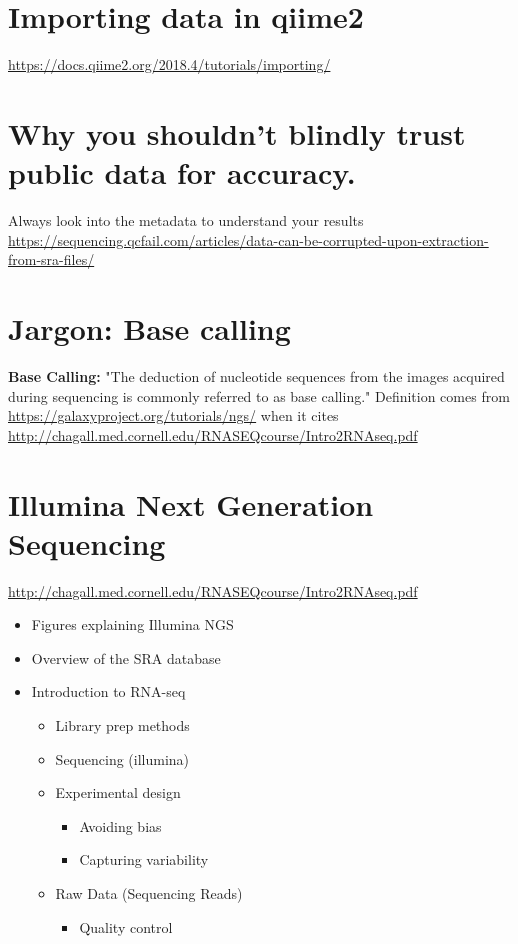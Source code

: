 \begin{fullpage}
\section{Importing data in qiime2}
\url{https://docs.qiime2.org/2018.4/tutorials/importing/}

\section{Why you shouldn't blindly trust public data for accuracy.} 
Always look into the metadata to understand your results \newline
\url{https://sequencing.qcfail.com/articles/data-can-be-corrupted-upon-extraction-from-sra-files/}


\section{Jargon: Base calling}
\textbf{Base Calling:} "The deduction of nucleotide sequences from the images acquired during sequencing is commonly referred to as base calling." Definition comes from \url{https://galaxyproject.org/tutorials/ngs/} when it cites \url{http://chagall.med.cornell.edu/RNASEQcourse/Intro2RNAseq.pdf}

\section{Illumina Next Generation Sequencing}
\url{http://chagall.med.cornell.edu/RNASEQcourse/Intro2RNAseq.pdf}
\begin{itemize}
\item Figures explaining Illumina NGS
\item Overview of the SRA database
\item Introduction to RNA-seq
    \begin{itemize}
    \item Library prep methods
    \item Sequencing (illumina)
    \item Experimental design
        \begin{itemize}
	\item Avoiding bias
	\item Capturing variability
	\end{itemize}
    \item Raw Data (Sequencing Reads)
	\begin{itemize}
	\item Quality control
	\end{itemize}


\end{itemize}
\end{itemize}
\end{fullpage}
